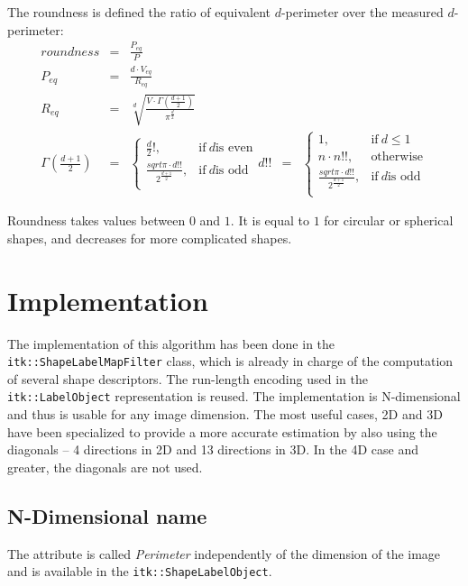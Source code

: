 \documentclass{InsightArticle}
\begin{document}
The roundness is defined the ratio of equivalent $d$-perimeter over the measured $d$-perimeter:
\begin{eqnarray}
roundness             & = & \frac{P_{eq}}{P} \\
P_{eq}                & = & \frac{d \cdot V_{eq}}{R_{eq}} \\
R_{eq}                & = & \sqrt[d]{\frac{V\cdot\Gamma(\frac{d+1}{2})}{\pi^\frac{d}{2}}} \\
\Gamma(\frac{d+1}{2}) & = & \begin{cases}
                               \frac{d}{2}!, & \text{if}~ d \text{is even} \\
                               \frac{sqrt{\pi} \cdot d!!}{2^{\frac{d+1}{2}}}, & \text{if}~ d \text{is odd} \\
                            \end{cases}
d!!                   & = & \begin{cases}
                               1, & \text{if}~ d \leq 1 \\
                               n \cdot n!!, & \text{otherwise} \\
                               \frac{sqrt{\pi} \cdot d!!}{2^{\frac{d+1}{2}}}, & \text{if}~ d \text{is odd} \\
                            \end{cases}
\end{eqnarray}


Roundness takes values between $0$ and $1$. 
It is equal to $1$ for circular or spherical shapes, 
and decreases for more complicated shapes.


\section{Implementation}

The implementation of this algorithm has been done in the \verb$itk::ShapeLabelMapFilter$ class, which is already in charge of the computation of
several shape descriptors. The run-length encoding used in the \verb$itk::LabelObject$ representation is reused.
The implementation is N-dimensional and thus is usable for any image dimension. The most useful cases, 2D and 3D have been specialized
to provide a more accurate estimation by also using the diagonals -- 4 directions in 2D and 13 directions in 3D. In the 4D case and greater,
the diagonals are not used.

\subsection{N-Dimensional name}
The attribute is called {\em Perimeter} independently of the dimension of the image and is available in the \verb$itk::ShapeLabelObject$.
\end{document}
